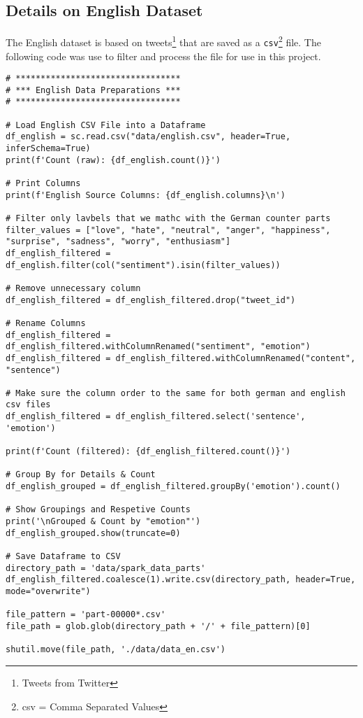 \subsection{Details on English Dataset}
\label{appendix:dataset_english}
The English dataset is based on tweets\footnote{Tweets from Twitter} that are saved as a \texttt{csv}\footnote{csv = Comma Separated Values} file. The following code was use to filter and process the file for use in this project.
\begin{verbatim}
# *********************************
# *** English Data Preparations ***
# *********************************

# Load English CSV File into a Dataframe
df_english = sc.read.csv("data/english.csv", header=True, inferSchema=True)
print(f'Count (raw): {df_english.count()}')

# Print Columns
print(f'English Source Columns: {df_english.columns}\n')

# Filter only lavbels that we mathc with the German counter parts
filter_values = ["love", "hate", "neutral", "anger", "happiness", "surprise", "sadness", "worry", "enthusiasm"]
df_english_filtered = df_english.filter(col("sentiment").isin(filter_values))

# Remove unnecessary column
df_english_filtered = df_english_filtered.drop("tweet_id")

# Rename Columns
df_english_filtered = df_english_filtered.withColumnRenamed("sentiment", "emotion")
df_english_filtered = df_english_filtered.withColumnRenamed("content", "sentence")

# Make sure the column order to the same for both german and english csv files
df_english_filtered = df_english_filtered.select('sentence', 'emotion')

print(f'Count (filtered): {df_english_filtered.count()}')

# Group By for Details & Count
df_english_grouped = df_english_filtered.groupBy('emotion').count()

# Show Groupings and Respetive Counts
print('\nGrouped & Count by "emotion"')
df_english_grouped.show(truncate=0)

# Save Dataframe to CSV
directory_path = 'data/spark_data_parts'
df_english_filtered.coalesce(1).write.csv(directory_path, header=True, mode="overwrite")

file_pattern = 'part-00000*.csv'
file_path = glob.glob(directory_path + '/' + file_pattern)[0]

shutil.move(file_path, './data/data_en.csv')
\end{verbatim}
\clearpage

